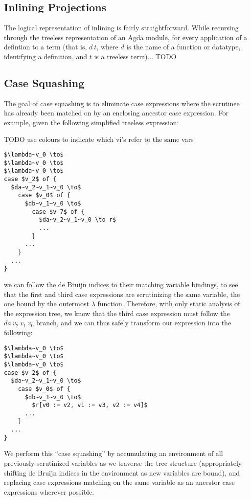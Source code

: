 \subsection{Inlining Projections}

The logical representation of inlining is fairly straightforward. While recursing through the treeless representation of an Agda module, for every application of a defintion to a term (that is, $d~t$, where $d$ is the name of a function or datatype, identifying a definition, and $t$ is a treeless term)... TODO

\subsection{Case Squashing}

The goal of case squashing is to eliminate case expressions where the scrutinee has already been matched on by an enclosing ancestor case expression. For example, given the following simplified treeless expression:

TODO use colours to indicate which vi's refer to the same vars

\begin{lstlisting}[style=math]
$\lambda~v_0 \to$
$\lambda~v_0 \to$
$\lambda~v_0 \to$
case $v_2$ of {
  $da~v_2~v_1~v_0 \to$
    case $v_0$ of {
      $db~v_1~v_0 \to$
        case $v_7$ of {
          $da~v_2~v_1~v_0 \to r$
          ...
        }
      ...
    }
  ...
}
\end{lstlisting}

we can follow the de Bruijn indices to their matching variable bindings, to see that the first and third case expressions are scrutinizing the same variable, the one bound by the outermost $\lambda$ function. Therefore, with only static analysis of the expression tree, we know that the third case expression must follow the $da~v_2~v_1~v_0$ branch, and we can thus safely transform our expression into the following:

\begin{lstlisting}[style=math]
$\lambda~v_0 \to$
$\lambda~v_0 \to$
$\lambda~v_0 \to$
case $v_2$ of {
  $da~v_2~v_1~v_0 \to$
    case $v_0$ of {
      $db~v_1~v_0 \to$
        $r[v0 := v2, v1 := v3, v2 := v4]$
      ...
    }
  ...
}
\end{lstlisting}

We perform this ``case squashing'' by accumulating an environment of all previously scrutinized variables as we traverse the tree structure (appropriately shifting de Bruijn indices in the environment as new variables are bound), and replacing case expressions matching on the same variable as an ancestor case expressions wherever possible.

